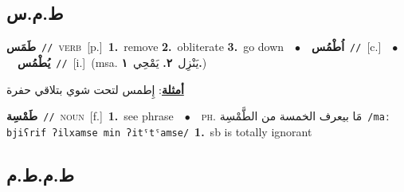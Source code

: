 \documentclass[10pt,a4paper,twoside]{article} %
\begin{document}
\begin{multicols}{2}
\vspace{-3mm}
\subsection*{\color{blue}\foreignlanguage{arabic}{ط.م.س}\color{blue}{}} 

{\setlength\topsep{0pt}\textbf{\foreignlanguage{arabic}{طَمَس}}\ {\color{gray}\texttt{//}\color{black}}\ \textsc{verb}\ [p.]\ \textbf{1.}~remove  \textbf{2.}~obliterate  \textbf{3.}~go down\ \ $\bullet$\ \ \setlength\topsep{0pt}\textbf{\foreignlanguage{arabic}{اُطْمُس}}\ {\color{gray}\texttt{//}\color{black}}\ [c.]\ \ $\bullet$\ \ \setlength\topsep{0pt}\textbf{\foreignlanguage{arabic}{يُطْمُس}}\ {\color{gray}\texttt{//}\color{black}}\ [i.]\ \color{gray}(msa. \foreignlanguage{arabic}{يَنْزِل}~\foreignlanguage{arabic}{\textbf{٢.}}  \foreignlanguage{arabic}{يَمْحِي}~\foreignlanguage{arabic}{\textbf{١.}})\color{black}\  \begin{flushright}\color{gray}\foreignlanguage{arabic}{\textbf{\underline{\foreignlanguage{arabic}{أمثلة}}}: إِطمس لتحت شوي بتلاقي حفرة}\end{flushright}\color{black}} \vspace{2mm}

{\setlength\topsep{0pt}\textbf{\foreignlanguage{arabic}{طَمْسِة}}\ {\color{gray}\texttt{//}\color{black}}\ \textsc{noun}\ [f.]\ \textbf{1.}~see phrase\ \ $\bullet$\ \ \textsc{ph.} \color{gray} \foreignlanguage{arabic}{مَا بيعرف الخمسة من الطَّمْسِة}\color{black}\ {\color{gray}\texttt{/{\sffamily maː bjiʕrif ʔilxamse min ʔitˤtˤamse}/}\color{black}}\ \textbf{1.}~sb is totally ignorant\ } \vspace{2mm}

\vspace{-3mm}
\subsection*{\color{blue}\foreignlanguage{arabic}{ط.م.ط.م}\color{blue}{}} 


\end{multicols}
\end{document}
